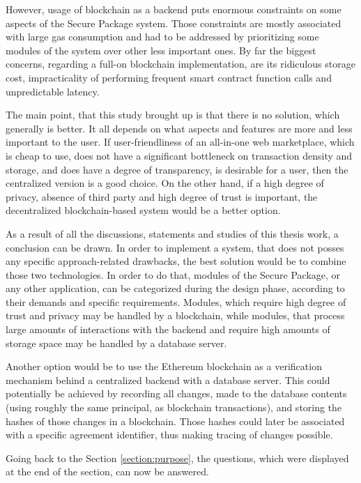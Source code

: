 However, usage of blockchain as a backend puts enormous constraints on some aspects of the Secure Package system. Those constraints are mostly associated with large gas consumption and had to be addressed by prioritizing some modules of the system over other less important ones. By far the biggest concerns, regarding a full-on blockchain implementation, are its ridiculous storage cost, impracticality of performing frequent smart contract function calls and unpredictable latency.

The main point, that this study brought up is that there is no solution, which generally is better. It all depends on what aspects and features are more and less important to the user. If user-friendliness of an all-in-one web marketplace, which is cheap to use, does not have a significant bottleneck on transaction density and storage, and does have a degree of transparency, is desirable for a user, then the centralized version is a good choice. On the other hand, if a high degree of privacy, absence of third party and high degree of trust is important, the decentralized blockchain-based system would be a better option.

As a result of all the discussions, statements and studies of this thesis work, a conclusion can be drawn. In order to implement a system, that does not posses any specific approach-related drawbacks, the best solution would be to combine those two technologies. In order to do that, modules of the Secure Package, or any other application, can be categorized during the design phase, according to their demands and specific requirements. Modules, which require high degree of trust and privacy may be handled by a blockchain, while modules, that process large amounts of interactions with the backend and require high amounts of storage space may be handled by a database server.

Another option would be to use the Ethereum blockchain as a verification mechanism behind a centralized backend with a database server. This could potentially be achieved by recording all changes, made to the database contents (using roughly the same principal, as blockchain transactions), and storing the hashes of those changes in a blockchain. Those hashes could later be associated with a specific agreement identifier, thus making tracing of changes possible.

Going back to the Section \ref{section:purpose}, the questions, which were displayed at the end of the section, can now be answered.

